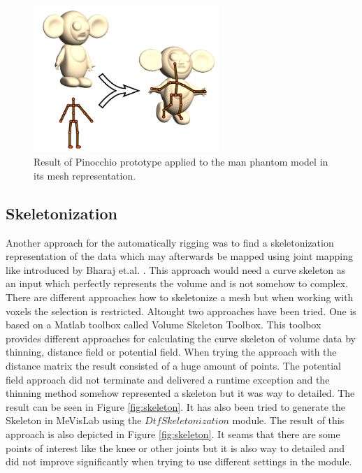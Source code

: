 \begin{figure} [!htb]
    \centering
	\includegraphics[width=7cm]{content/images/Pinocchio}
	\caption{Result of Pinocchio prototype applied to the man phantom model in its mesh representation.} 
	\label{fig:PinocchioSkeleton}
\end{figure}

\subsection{Skeletonization}
Another approach for the automatically rigging was to find a skeletonization representation of the data which may afterwards be mapped using joint mapping like introduced by Bharaj et.al. \cite{Bharaj2012}. This approach would need a curve skeleton as an input which perfectly represents the volume and is not somehow to complex. There are different approaches how to skeletonize a mesh but when working with voxels the selection is restricted. Altought two approaches have been tried. One is based on a Matlab toolbox called Volume Skeleton Toolbox. This toolbox provides different approaches for calculating the curve skeleton of volume data by thinning, distance field or potential field. When trying the approach with the distance matrix the result consisted of a huge amount of points. The potential field approach did not terminate and delivered a runtime exception and the thinning method somehow represented a skeleton but it was way to detailed. The result can be seen in Figure \ref{fig:skeleton}.\newline
It has also been tried to generate the Skeleton in MeVisLab using the $DtfSkeletonization$ module. The result of this approach is also depicted in Figure \ref{fig:skeleton}. It seams that there are some points of interest like the knee or other joints but it is also way to detailed and did not improve significantly when trying to use different settings in the module.

